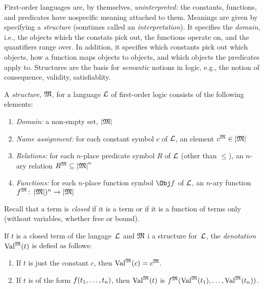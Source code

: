 \documentclass[open-logic-section]{subfiles}
\begin{document}

\begin{wordy}
First-order languages are, by themselves, \emph{uninterpreted:} the
constants, functions, and predicates have nospecific meaning attached
to them.  Meanings are given by specifying a \emph{structure}
(somtimes called an \emph{interpretation}).  It specifies the
\emph{domain}, i.e., the objects which the constats pick out, the
functions operate on, and the quantifiers range over. In addition, it
specifies which constants pick out which objects, how a function maps
objects to objects, and which objects the predicates apply to.
Structures are the basis for \emph{semantic} notions in logic, e.g.,
the notion of consequence, validity, satisfiablity.
\end{wordy}

\begin{defn}[Structure]
A \emph{structure}, $\mathfrak{M}$, for a language $\mathcal{L}$ of
first-order logic consists of the following elements:
\begin{enumerate}
\item \emph{Domain:} a non-empty set, $\left| \mathfrak M \right|$ 
\item \emph{Name assignment:} for each constant symbol $c$ of
  $\mathcal{L}$, an element $c^{\mathfrak M} \in \left| \mathfrak M \right|$
\item \emph{Relations:} for each $n$-place predicate symbol $R$ of
  $\mathcal{L}$ (other than $\leq$), an $n$-ary relation $R^{\mathfrak M}
  \subseteq \left| \mathfrak M \right|^n$
\item \emph{Functions:} for each $n$-place function symbol $\Obj f$ of
  $\mathcal{L}$, an $n$-ary function $f^{\mathfrak M} \colon
  \left| \mathfrak M \right|)^n \to \left| \mathfrak M \right|$
\end{enumerate}
\end{defn}

\begin{wordy}
Recall that a term is \emph{closed} if it is a term or if it is a
function of terms only (without variables, whether free or bound).
\end{wordy}

\begin{defn}
If $t$ is a closed term of the langage~$\mathcal L$ and $\mathfrak M$ i a
structure for~$\mathcal L$, the \emph{denotation}~$\Value{t}{M}$ is
defied as follows:
\begin{enumerate}
\item If $t$ is just the constant $c$, then $\Value{c}{M} = \Assign{c}{M}$.
\item If $t$ is of the form ${ f(t_1, \ldots, t_n) }$, then
  $\Value{t}{M}$ is $\Assign{f}{M}(\Value{t_1}{M}, \ldots,
  \Value{t_n}{M})$.
\end{enumerate}
\end{defn}
\end{document}
